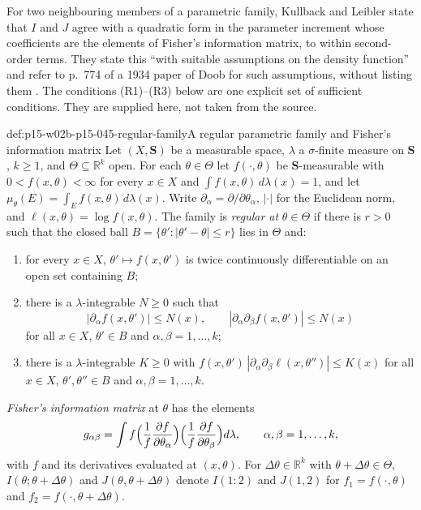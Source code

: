 For two neighbouring members of a parametric family, Kullback and
Leibler state that \(I\) and \(J\) agree with a quadratic form in the
parameter increment whose coefficients are the elements of Fisher's
information matrix, to within second-order terms. They state this ``with
suitable assumptions on the density function'' and refer to p.~774 of
a 1934 paper of Doob for such assumptions, without listing them
\cite[p.~81, eqs.~(2.7)--(2.9)]{KullbackLeibler1951Information}. The
conditions (R1)--(R3) below are one explicit set of sufficient
conditions. They are supplied here, not taken from the source.

\begin{hbdefinition}{def:p15-w02b-p15-045-regular-family}{A regular parametric family and Fisher's information matrix}
Let \((X,\mathbf S)\) be a measurable space, \(\lambda\) a
\(\sigma\)-finite measure on \(\mathbf S\), \(k\geq1\), and
\(\Theta\subseteq\mathbb R^k\) open. For each \(\theta\in\Theta\) let
\(f(\cdot,\theta)\) be \(\mathbf S\)-measurable with
\(0<f(x,\theta)<\infty\) for every \(x\in X\) and
\(\int f(x,\theta)\,d\lambda(x)=1\), and let
\(\mu_\theta(E)=\int_Ef(x,\theta)\,d\lambda(x)\). Write
\(\partial_\alpha=\partial/\partial\theta_\alpha\), \(|\cdot|\) for the
Euclidean norm, and \(\ell(x,\theta)=\log f(x,\theta)\).
The family is \emph{regular at} \(\theta\in\Theta\) if there is \(r>0\)
such that the closed ball \(B=\{\theta':|\theta'-\theta|\leq r\}\) lies
in \(\Theta\) and:
\begin{enumerate}
\item[(R1)] for every \(x\in X\), \(\theta'\mapsto f(x,\theta')\) is
twice continuously differentiable on an open set containing \(B\);
\item[(R2)] there is a \(\lambda\)-integrable \(N\geq0\) such that
\[
  |\partial_\alpha f(x,\theta')|\leq N(x),\qquad
  |\partial_\alpha\partial_\beta f(x,\theta')|\leq N(x)
\]
for all \(x\in X\), \(\theta'\in B\) and \(\alpha,\beta=1,\dots,k\);
\item[(R3)] there is a \(\lambda\)-integrable \(K\geq0\) with
\(f(x,\theta')\,|\partial_\alpha\partial_\beta\ell(x,\theta'')|\leq K(x)\)
for all \(x\in X\), \(\theta',\theta''\in B\) and
\(\alpha,\beta=1,\dots,k\).
\end{enumerate}
\emph{Fisher's information matrix} at \(\theta\) has the elements
\[
  g_{\alpha\beta}=\int f\Bigl(\frac1f\frac{\partial f}{\partial\theta_\alpha}\Bigr)
                     \Bigl(\frac1f\frac{\partial f}{\partial\theta_\beta}\Bigr)d\lambda,
  \qquad\alpha,\beta=1,\dots,k,
\]
with \(f\) and its derivatives evaluated at \((x,\theta)\). For
\(\Delta\theta\in\mathbb R^k\) with \(\theta+\Delta\theta\in\Theta\),
\(I(\theta;\theta+\Delta\theta)\) and \(J(\theta,\theta+\Delta\theta)\)
denote \(I(1:2)\) and \(J(1,2)\) for \(f_1=f(\cdot,\theta)\) and
\(f_2=f(\cdot,\theta+\Delta\theta)\).
\end{hbdefinition}

